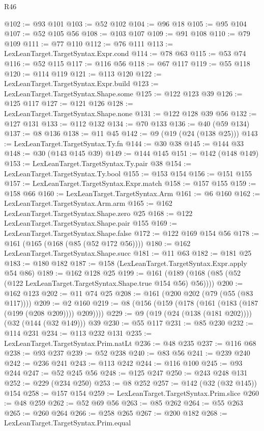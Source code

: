 \begin{lexlean}{R46}
\begin{coremodule}
@102 := @93 @101
@103 := @52 @102
@104 := @96 @18
@105 := @95 @104
@107 := @52 @105 @56
@108 := @103 @107
@109 := @91 @108
@110 := @79 @109
@111 := @77 @110
@112 := @76 @111
@113 := LexLeanTarget.TargetSyntax.Expr.cond
@114 := @78 @63
@115 := @53 @74
@116 := @52 @115
@117 := @116 @56
@118 := @67 @117
@119 := @55 @118
@120 := @114 @119
@121 := @113 @120
@122 := LexLeanTarget.TargetSyntax.Expr.build
@123 := LexLeanTarget.TargetSyntax.Shape.some
@125 := @122 @123 @39
@126 := @125 @117
@127 := @121 @126
@128 := LexLeanTarget.TargetSyntax.Shape.none
@131 := @122 @128 @39 @56
@132 := @127 @131
@133 := @112 @132
@134 := @70 @133
@136 := @40 (@59 @134)
@137 := @8 @136
@138 := @11 @45
@142 := @9 (@19 (@24 (@138 @25)))
@143 := LexLeanTarget.TargetSyntax.Ty.fn
@144 := @30 @38
@145 := @144 @33
@148 := @30 (@143 @145 @39)
@149 := @144 @145
@151 := @142 (@148 @149)
@153 := LexLeanTarget.TargetSyntax.Ty.pair @38
@154 := LexLeanTarget.TargetSyntax.Ty.bool
@155 := @153 @154
@156 := @151 @155
@157 := LexLeanTarget.TargetSyntax.Expr.match
@158 := @157 @155
@159 := @158 @66
@160 := LexLeanTarget.TargetSyntax.Arm
@161 := @6 @160
@162 := LexLeanTarget.TargetSyntax.Arm.arm
@165 := @162 LexLeanTarget.TargetSyntax.Shape.zero @25
@168 := @122 LexLeanTarget.TargetSyntax.Shape.pair @155
@169 := LexLeanTarget.TargetSyntax.Shape.false
@172 := @122 @169 @154 @56
@178 := @161 (@165 (@168 (@85 (@52 @172 @56))))
@180 := @162 LexLeanTarget.TargetSyntax.Shape.succ
@181 := @11 @63
@182 := @181 @25
@183 := @180 @182
@187 := @158 (LexLeanTarget.TargetSyntax.Expr.apply @54 @86)
@189 := @162 @128 @25
@199 := @161 (@189 (@168 (@85 (@52 (@122 LexLeanTarget.TargetSyntax.Shape.true @154 @56) @56))))
@200 := @162 @123
@202 := @11 @74 @25
@208 := @161 (@200 @202 (@79 (@55 (@83 @117))))
@209 := @2 @160
@219 := @8 (@156 (@159 (@178 (@161 (@183 (@187 (@199 (@208 @209)))) @209))))
@229 := @9 (@19 (@24 (@138 (@181 @202)))) (@32 (@144 (@32 @149))) @39
@230 := @55 @117
@231 := @85 @230
@232 := @114 @231
@234 := @113 @232 @131
@235 := LexLeanTarget.TargetSyntax.Prim.natLt
@236 := @48 @235
@237 := @116 @68
@238 := @93 @237
@239 := @52 @238
@240 := @83 @56
@241 := @239 @240
@242 := @236 @241
@243 := @113 @242
@244 := @116 @100
@245 := @93 @244
@247 := @52 @245 @56
@248 := @125 @247
@250 := @243 @248 @131
@252 := @229 (@234 @250)
@253 := @8 @252
@257 := @142 (@32 (@32 @145)) @154
@258 := @157 @154
@259 := LexLeanTarget.TargetSyntax.Prim.slice
@260 := @48 @259
@262 := @52 @69 @56
@263 := @85 @262
@264 := @55 @263
@265 := @260 @264
@266 := @258 @265
@267 := @200 @182
@268 := LexLeanTarget.TargetSyntax.Prim.equal

\end{coremodule}
\end{lexlean}
